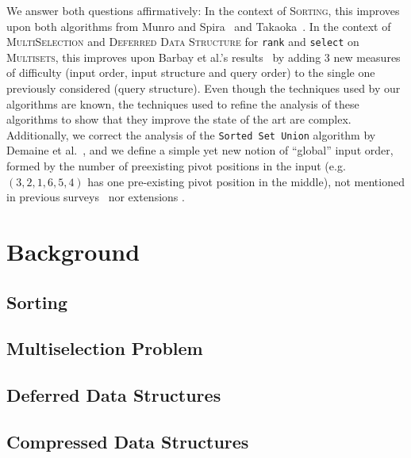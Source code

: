 We answer both questions affirmatively: 
%
In the context of \textsc{Sorting}, this improves upon both algorithms from Munro and Spira~\cite{1976-JComp-SortingAndSearchingInMultisets-MunroSpira} and Takaoka~\cite{2009-Chapter-PartialSolutionAndEntropy-Takaoka}. 
%
In the context of \textsc{MultiSelection} and \textsc{Deferred Data
  Structure} for \texttt{rank} and \texttt{select} on
\textsc{Multisets}, this improves upon Barbay et al.'s
results~\cite{2016-JDA-NearOptimalOnlineMultiselectionInInternalAndExternalMemory-BarbayGuptaRaoSorenson}
by adding 3 new measures of difficulty (input order, input structure
and query order) to the single one previously considered (query
structure). Even though the techniques used by our algorithms are
known, the techniques used to refine the analysis of these algorithms
to show that they improve the state of the art are complex.
%
Additionally, 
%
we correct the analysis of the \texttt{Sorted Set Union} algorithm by Demaine et al.~\cite{2000-SODA-AdaptiveSetIntersectionsUnionsAndDifferences-DemaineLopezOrtizMunro}, and
%
we define a simple yet new notion of ``global'' input order, formed by the number of
  preexisting pivot positions in the input (e.g. $(3,2,1,6,5,4)$ has
  one pre-existing pivot position in the middle), not
mentioned in previous
surveys~\cite{1992-ACMCS-ASurveyOfAdaptiveSortingAlgorithms-EstivillCastroWood,1992-ACJ-AnOverviewOfAdaptiveSorting-MoffatPetersson} nor extensions \cite{2013-TCS-OnCompressingPermutationsAndAdaptiveSorting-BarbayNavarro}.

\section{Background}

\subsection{Sorting}

\subsection{Multiselection Problem}

\subsection{Deferred Data Structures}

\subsection{Compressed Data Structures}

